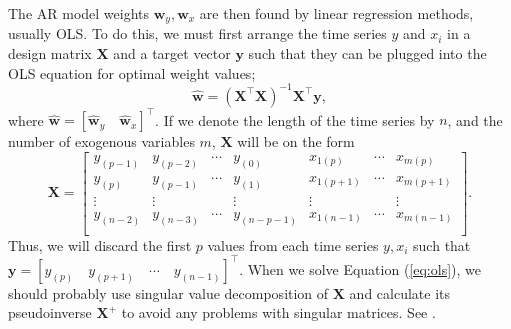 \documentclass[]{article}
\begin{document}
The AR model weights $\mathbf{w}_y, \mathbf{w}_x$ are then found by linear regression methods, usually OLS. To do this, we must first arrange the time series $y$ and $x_i$ in a design matrix $\mathbf{X}$ and a target vector $\mathbf{y}$ such that they can be plugged into the OLS equation for optimal weight values;
\begin{equation} \label{eq:ols}
	\hat{\mathbf{w}} = (\mathbf{X}^\intercal \mathbf{X})^{-1} \mathbf{X}^\intercal \mathbf{y},
\end{equation}
where $\hat{\mathbf{w}} = [\hat{\mathbf{w}}_y \quad \hat{\mathbf{w}}_x]^\intercal$. If we denote the length of the time series by $n$, and the number of exogenous variables $m$, $\mathbf{X}$ will be on the form
\begin{equation}
\mathbf{X} = 
	\left[ 
	\begin{array}{ccccccc}
		y_{(p-1)} & y_{(p-2)} & \cdots & y_{(0)} & x_{1(p)} & \cdots &  x_{m(p)} \\
		y_{(p)}   & y_{(p-1)} & \cdots & y_{(1)} & x_{1(p+1)} & \cdots &  x_{m(p+1)} \\	
		\vdots  & \vdots  &          & \vdots  & \vdots   &        &  \vdots   \\
		y_{(n-2)} & y_{(n-3)} & \cdots & y_{(n-p-1)} & x_{1(n-1)} & \cdots &  x_{m(n-1)} \\			
	\end{array}
\right].
\end{equation}
Thus, we will discard the first $p$ values from each time series $y, x_i$ such that  $\mathbf{y} = [y_{(p)} \quad y_{(p+1)} \quad \cdots \quad y_{(n-1)}]^\intercal$. When we solve Equation (\ref{eq:ols}), we should probably use singular value decomposition of $\mathbf{X}$ and calculate its pseudoinverse $\mathbf{X}^+$ to avoid any problems with singular matrices. See \cite{lay2016linear}.
\end{document}
